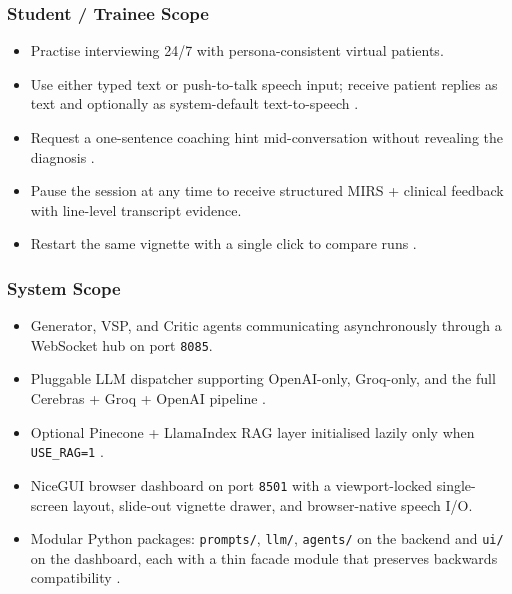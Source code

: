 \documentclass{article}
\begin{document}
\subsubsection*{Student / Trainee Scope}
\begin{itemize}
    \item Practise interviewing 24/7 with persona-consistent virtual patients.
    \item Use either typed text or push-to-talk speech input; receive patient replies as text and optionally as system-default text-to-speech \cite{Plale2013BigDO}.
    \item Request a one-sentence coaching hint mid-conversation without revealing the diagnosis \cite{Krugmann2024SentimentAI}.
    \item Pause the session at any time to receive structured MIRS + clinical feedback with line-level transcript evidence.
    \item Restart the same vignette with a single click to compare runs \cite{Jing2024WhenLL}.
\end{itemize}

\subsubsection*{System Scope}
\begin{itemize}
    \item Generator, VSP, and Critic agents communicating asynchronously through a WebSocket hub on port \texttt{8085}.
    \item Pluggable LLM dispatcher supporting OpenAI-only, Groq-only, and the full Cerebras + Groq + OpenAI pipeline \cite{Cheptsov2013IntroducingAN}.
    \item Optional Pinecone + LlamaIndex RAG layer initialised lazily only when \texttt{USE\_RAG=1} \cite{Monir2024VectorSearchED}.
    \item NiceGUI browser dashboard on port \texttt{8501} with a viewport-locked single-screen layout, slide-out vignette drawer, and browser-native speech I/O.
    \item Modular Python packages: \texttt{prompts/}, \texttt{llm/}, \texttt{agents/} on the backend and \texttt{ui/} on the dashboard, each with a thin facade module that preserves backwards compatibility \cite{Rygl2017SemanticVE}.
\end{itemize}
\end{document}
